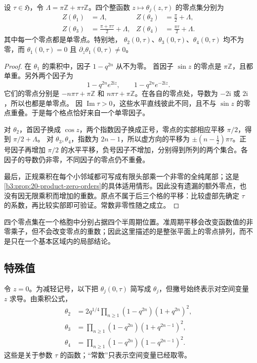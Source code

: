 \begin{proposition}\label{b3:prop:24-theta-zeros}
设 \(\tau\in\mathfrak H\)，令
\(\Lambda=\pi\mathbb Z+\pi\tau\mathbb Z\)。四个整函数
\(z\mapsto\theta_j(z,\tau)\) 的零点集分别为
\[
 \begin{aligned}
 Z(\theta_1)&=\Lambda,
 &Z(\theta_2)&=\frac{\pi}{2}+\Lambda,\\
 Z(\theta_3)&=\frac{\pi+\pi\tau}{2}+\Lambda,
 &Z(\theta_4)&=\frac{\pi\tau}{2}+\Lambda.
 \end{aligned}
\]
其中每一个零点都是单零点。特别地，
\(\theta_2(0,\tau)\)、\(\theta_3(0,\tau)\)、\(\theta_4(0,\tau)\)
均不为零，而 \(\theta_1(0,\tau)=0\) 且
\(\partial_z\theta_1(0,\tau)\ne0\)。
\end{proposition}
\begin{proof}
在 \(\theta_1\) 的乘积中，因子 \(1-q^{2n}\) 从不为零。
首因子 \(\sin z\) 的零点是 \(\pi\mathbb Z\)，且都单重。另外两个因子为
\[
 1-q^{2n}e^{2\mathrm iz},\qquad
 1-q^{2n}e^{-2\mathrm iz}.
\]
它们的零点分别是 \(-n\pi\tau+\pi\mathbb Z\) 和
\(n\pi\tau+\pi\mathbb Z\)。在各自的零点处，导数为
\(-2\mathrm i\) 或 \(2\mathrm i\)，所以也都是单零点。
因 \(\operatorname{Im}\tau>0\)，这些水平直线彼此不同，且不与
\(\sin z\) 的零点重叠。于是每个格点恰好来自一个单零因子。

对 \(\theta_2\)，首因子换成 \(\cos z\)，两个指数因子换成正号，零点的实部相应平移 \(\pi/2\)，得到 \(\pi/2+\Lambda\)。
对 \(\theta_3,\theta_4\)，指数为 \(2n-1\)，所以虚方向的平移为
\(\pm(n-\tfrac12)\pi\tau\)。正号因子再增加 \(\pi/2\) 的水平平移，负号因子不增加，分别得到所列的两个集合。各因子的导数仍非零，不同因子的零点仍不重叠。

最后，正规乘积在每个小邻域都可写成有限头部乘一个非零的全纯尾部；这是\cref{b3:prop:20-product-zero-orders}的具体适用情形。因此没有遗漏的额外零点，也没有因无限乘积而增加的重数。原点不属于后三个格的平移：比较虚部先确定 \(\tau\) 的系数，再比较实部即可验证。常数非零性随之成立。
\end{proof}

四个零点集在一个格胞中分别占据四个半周期位置。准周期平移会改变函数值的非零乘子，但不会改变零点的重数；因此这里描述的是整张平面上的零点排列，而不是只在一个基本区域内的局部结论。

\subsection{特殊值}
\label{b3:subsec:240203}

令 \(z=0\)。为减轻记号，以下把 \(\theta_j(0,\tau)\) 简写成
\(\theta_j\)，但撇号始终表示对空间变量 \(z\) 求导。由乘积公式，
\[
 \begin{aligned}
 \theta_2&=2q^{1/4}
       \prod_{n\ge1}(1-q^{2n})(1+q^{2n})^2,\\
 \theta_3&=\prod_{n\ge1}(1-q^{2n})(1+q^{2n-1})^2,\\
 \theta_4&=\prod_{n\ge1}(1-q^{2n})(1-q^{2n-1})^2.
 \end{aligned}
\]
这些是关于参数 \(\tau\) 的函数；“常数”只表示空间变量已经取零。

